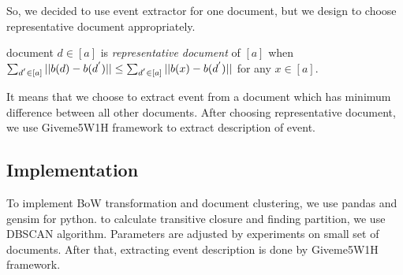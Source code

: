 So, we decided to use event extractor for one document, but we design to choose
representative document appropriately.

\begin{definition}
    document $d \in [a]$ is \textit{representative document} of $[a]$ when
    $\sum_{d^{'} \in [a]} ||b(d) - b(d^{'})|| \\ \leq \sum_{d^{'} \in [a]} ||b(x) - b(d^{'})||$ 
    for any $x \in [a]$.
\end{definition}

It means that we choose to extract event from a document which has
minimum difference between all other documents. After choosing representative
document, we use Giveme5W1H framework\cite{Hamborg2019b} to extract description of event.

\subsection{Implementation}

To implement BoW transformation and document clustering, we use pandas and gensim for python.
to calculate transitive closure and finding partition, we use DBSCAN algorithm. Parameters
are adjusted by experiments on small set of documents. After that, extracting event
description is done by Giveme5W1H framework.
